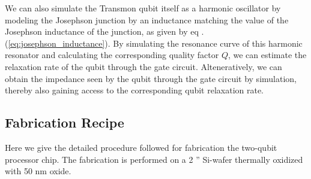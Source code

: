 We can also simulate the Transmon qubit itself as a harmonic oscillator by modeling the Josephson junction by an inductance matching the value of the Josephson inductance of the junction, as given by eq .(\ref{eq:josephson_inductance}). By simulating the resonance curve of this harmonic resonator and calculating the corresponding quality factor $Q$, we can estimate the relaxation rate of the qubit through the gate circuit. Alteneratively, we can obtain the impedance seen by the qubit through the gate circuit by simulation, thereby also gaining access to the corresponding qubit relaxation rate.

\subsection{Fabrication Recipe}

Here we give the detailed procedure followed for fabrication the two-qubit processor chip. The fabrication is performed on a 2 '' Si-wafer thermally oxidized with 50 nm oxide.

